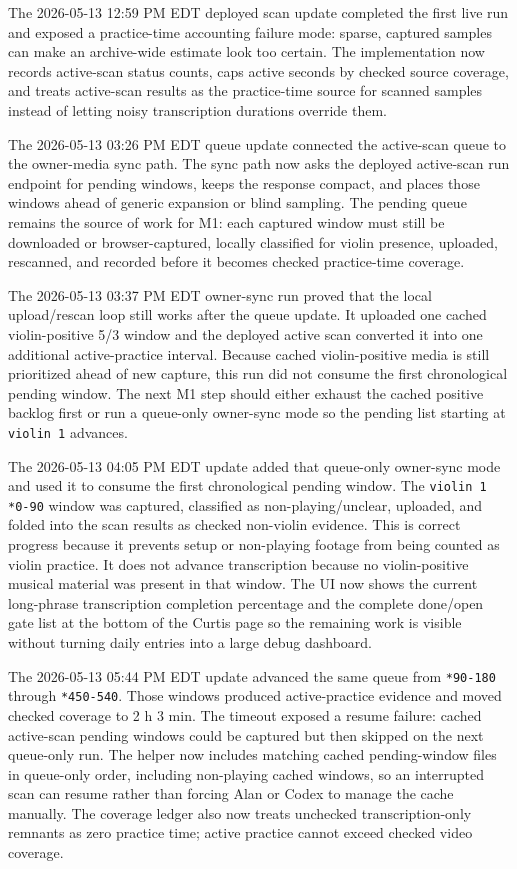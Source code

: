 The 2026-05-13 12:59 PM EDT deployed scan update completed the first live run and exposed a practice-time accounting failure mode: sparse, captured samples can make an archive-wide estimate look too certain. The implementation now records active-scan status counts, caps active seconds by checked source coverage, and treats active-scan results as the practice-time source for scanned samples instead of letting noisy transcription durations override them.

The 2026-05-13 03:26 PM EDT queue update connected the active-scan queue to the owner-media sync path. The sync path now asks the deployed active-scan run endpoint for pending windows, keeps the response compact, and places those windows ahead of generic expansion or blind sampling. The pending queue remains the source of work for M1: each captured window must still be downloaded or browser-captured, locally classified for violin presence, uploaded, rescanned, and recorded before it becomes checked practice-time coverage.

The 2026-05-13 03:37 PM EDT owner-sync run proved that the local upload/rescan loop still works after the queue update. It uploaded one cached violin-positive 5/3 window and the deployed active scan converted it into one additional active-practice interval. Because cached violin-positive media is still prioritized ahead of new capture, this run did not consume the first chronological pending window. The next M1 step should either exhaust the cached positive backlog first or run a queue-only owner-sync mode so the pending list starting at \texttt{violin 1} advances.

The 2026-05-13 04:05 PM EDT update added that queue-only owner-sync mode and used it to consume the first chronological pending window. The \texttt{violin 1} \texttt{*0-90} window was captured, classified as non-playing/unclear, uploaded, and folded into the scan results as checked non-violin evidence. This is correct progress because it prevents setup or non-playing footage from being counted as violin practice. It does not advance transcription because no violin-positive musical material was present in that window. The UI now shows the current long-phrase transcription completion percentage and the complete done/open gate list at the bottom of the Curtis page so the remaining work is visible without turning daily entries into a large debug dashboard.

The 2026-05-13 05:44 PM EDT update advanced the same queue from \texttt{*90-180} through \texttt{*450-540}. Those windows produced active-practice evidence and moved checked coverage to 2 h 3 min. The timeout exposed a resume failure: cached active-scan pending windows could be captured but then skipped on the next queue-only run. The helper now includes matching cached pending-window files in queue-only order, including non-playing cached windows, so an interrupted scan can resume rather than forcing Alan or Codex to manage the cache manually. The coverage ledger also now treats unchecked transcription-only remnants as zero practice time; active practice cannot exceed checked video coverage.

